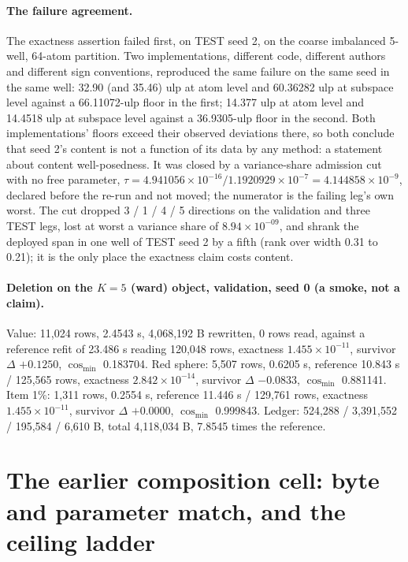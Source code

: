 \documentclass{article} %
\newcommand{\sci}[2]{\ensuremath{#1\times10^{#2}}}
\begin{document}
\paragraph{The failure agreement.} The exactness assertion failed first, on TEST seed 2, on the
coarse imbalanced 5-well, 64-atom partition. Two implementations, different code, different
authors and different sign conventions, reproduced the same failure on the same seed in the same
well: 32.90 (and 35.46) ulp at atom level and 60.36282 ulp at subspace level against a 66.11072-ulp
floor in the first; 14.377 ulp at atom level and 14.4518 ulp at subspace level against a
36.9305-ulp floor in the second. Both implementations' floors exceed their observed deviations
there, so both conclude that seed 2's content is not a function of its data by any method: a
statement about content well-posedness. It was closed by a variance-share admission cut with no
free parameter, $\tau=4.941056\times10^{-16}/1.1920929\times10^{-7}=4.144858\times10^{-9}$, declared
before the re-run and not moved; the numerator is the failing leg's own worst.
The cut dropped 3 / 1 / 4 / 5 directions on the validation and three TEST legs, lost at worst a
variance share of \sci{8.94}{-09}, and shrank the deployed span in one well of TEST seed 2 by a fifth
(rank over width 0.31 to 0.21); it is the only place the exactness claim costs content.

\paragraph{Deletion on the $K=5$ (ward) object, validation, seed 0 (a smoke, not a claim).} Value:
11,024 rows, 2.4543 s, 4,068,192 B rewritten, 0 rows read, against a reference refit of 23.486 s
reading 120,048 rows, exactness \sci{1.455}{-11}, survivor $\Delta$ $+0.1250$, $\cos_{\min}$
0.183704. Red sphere: 5,507 rows, 0.6205 s, reference 10.843 s / 125,565 rows, exactness
\sci{2.842}{-14}, survivor $\Delta$ $-0.0833$, $\cos_{\min}$ 0.881141. Item 1\%: 1,311 rows,
0.2554 s, reference 11.446 s / 129,761 rows, exactness \sci{1.455}{-11}, survivor $\Delta$
$+0.0000$, $\cos_{\min}$ 0.999843. Ledger: 524,288 / 3,391,552 / 195,584 / 6,610 B, total
4,118,034 B, 7.8545 times the reference. %

\section{The earlier composition cell: byte and parameter match, and the ceiling ladder}
\label{app:w5}
\end{document}
